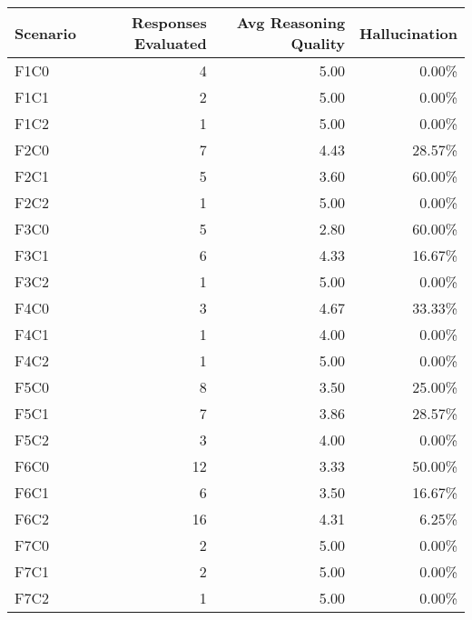 \begin{tabular}{lrrr}
\toprule
Scenario & Responses Evaluated & Avg Reasoning Quality & Hallucination \\
\midrule
F1C0 & 4 & 5.00 & 0.00\% \\
F1C1 & 2 & 5.00 & 0.00\% \\
F1C2 & 1 & 5.00 & 0.00\% \\
F2C0 & 7 & 4.43 & 28.57\% \\
F2C1 & 5 & 3.60 & 60.00\% \\
F2C2 & 1 & 5.00 & 0.00\% \\
F3C0 & 5 & 2.80 & 60.00\% \\
F3C1 & 6 & 4.33 & 16.67\% \\
F3C2 & 1 & 5.00 & 0.00\% \\
F4C0 & 3 & 4.67 & 33.33\% \\
F4C1 & 1 & 4.00 & 0.00\% \\
F4C2 & 1 & 5.00 & 0.00\% \\
F5C0 & 8 & 3.50 & 25.00\% \\
F5C1 & 7 & 3.86 & 28.57\% \\
F5C2 & 3 & 4.00 & 0.00\% \\
F6C0 & 12 & 3.33 & 50.00\% \\
F6C1 & 6 & 3.50 & 16.67\% \\
F6C2 & 16 & 4.31 & 6.25\% \\
F7C0 & 2 & 5.00 & 0.00\% \\
F7C1 & 2 & 5.00 & 0.00\% \\
F7C2 & 1 & 5.00 & 0.00\% \\
\bottomrule
\end{tabular}
